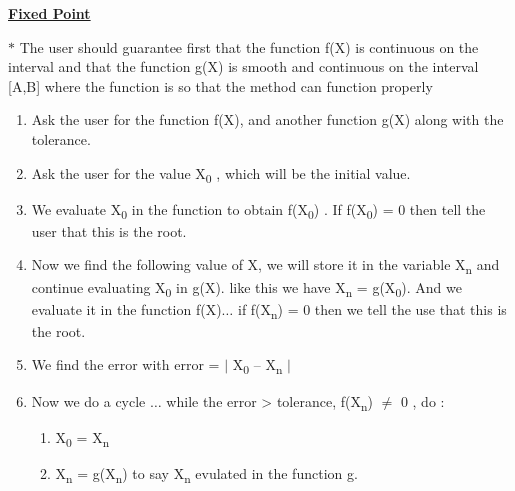 \documentclass[12pt]{article}
\renewcommand{\_}{\kern-1.5pt\textunderscore\kern-1.5pt}
\begin{document}
{\fontsize{16pt}{19.2pt}\selectfont \textbf{\uline{Fixed Point }}\par}\par

$\ast$ The user should guarantee first that the function f(X) is continuous on the interval and that the function g(X) is smooth and continuous on the interval [A,B] where the function is so that the method can function properly\par

\begin{enumerate}
	\item Ask the user for the function f(X), and another function g(X) along with the tolerance.\par

	\item Ask the user for the value X\textsubscript{0 }, \textsubscript{ }which will be the initial value. \par

	\item We evaluate X\textsubscript{0 }in the function to obtain f(X\textsubscript{0}) . If f(X\textsubscript{0}) = 0 then tell the user that this is the root. \par

	\item Now we find the following value of X, we will store it in the variable X\textsubscript{n} and continue evaluating X\textsubscript{0} in g(X). like this we have X\textsubscript{n }= g(X\textsubscript{0}). And we evaluate it in the function f(X)$ \ldots $  if f(X\textsubscript{n}) = 0 then we tell the use that this is the root. \par

	\item We find the error with error = $ \vert $  X\textsubscript{0 }– X\textsubscript{n }$ \vert $ \par

	\item Now we do a cycle $ \ldots $  while the error > tolerance, f(X\textsubscript{n}) $ \neq $  0 , do :\par

\begin{enumerate}
	\item X\textsubscript{0} = X\textsubscript{n}\par

	\item X\textsubscript{n} = g(X\textsubscript{n}) to say X\textsubscript{n }evulated in the function g. \par


\end{enumerate}
\end{enumerate}
\end{document}
